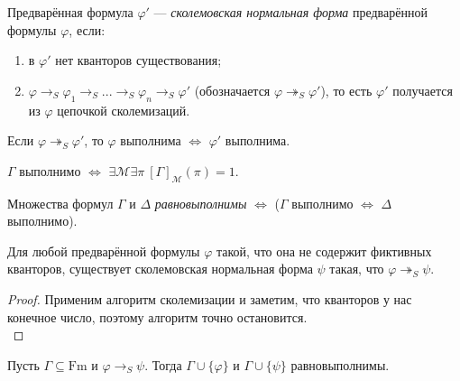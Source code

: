 \documentclass[a4paper, fleqn]{article}
\begin{document}
    \begin{definition}
        Предварённая формула $\varphi'$ --- \textit{сколемовская нормальная форма} предварённой формулы $\varphi$, если:
        \vspace{-\baselineskip}
        \begin{enumerate}
            \item в $\varphi'$ нет кванторов существования;
            \item $\varphi \rightarrow_S \varphi_1 \rightarrow_S ... \rightarrow_S \varphi_n \rightarrow_S \varphi'$ (обозначается $\varphi \twoheadrightarrow_S \varphi'$), то есть $\varphi'$ получается из $\varphi$ цепочкой сколемизаций. \\
        \end{enumerate} 
    \end{definition}

    \begin{fact}
        Если $\varphi \twoheadrightarrow_S \varphi'$, то $\varphi$ выполнима $\iff$ $\varphi'$ выполнима.
    \end{fact}
    
    \begin{definition}
        $\Gamma$ выполнимо $\iff$ $\exists \mathcal{M} \exists \pi~ [\Gamma]_{\mathcal{M}}(\pi) = 1$.
    \end{definition}
    
    \begin{definition}
        Множества формул $\Gamma$ и $\Delta$ {\it равновыполнимы} $\iff$ ($\Gamma$ выполнимо $\iff$ $\Delta$ выполнимо).
    \end{definition}
    
    \begin{proposal}
        Для любой предварённой формулы $\varphi$ такой, что она не содержит фиктивных кванторов, существует сколемовская нормальная форма $\psi$ такая, что $\varphi \twoheadrightarrow_{S} \psi$.
    \end{proposal} \vspace{-\baselineskip}
    \begin{proof}
        Применим алгоритм сколемизации и заметим, что кванторов у нас конечное число, поэтому алгоритм точно остановится. \\
    \end{proof}

    \begin{theorem}[о сколемизации]
        Пусть $\Gamma \subseteq \text{Fm}$ и $\varphi \to_{S} \psi$.
        Тогда $\Gamma \cup \{\varphi\}$ и $\Gamma \cup \{\psi\}$ равновыполнимы.
    \end{theorem}
    
\end{document}
